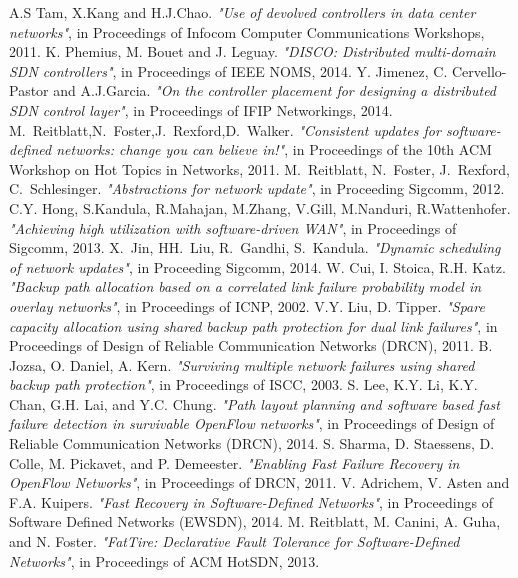 \documentclass[conference]{IEEEtran}
\begin{document}
\begin{thebibliography}{1}
A.S Tam, X.Kang and H.J.Chao. \emph{"Use of devolved controllers in data center networks"}, in Proceedings of Infocom Computer Communications Workshops, 2011.
K. Phemius, M. Bouet and J. Leguay. \emph{"DISCO: Distributed multi-domain SDN controllers"}, in Proceedings of IEEE NOMS, 2014.
Y. Jimenez, C. Cervello-Pastor and A.J.Garcia. \emph{"On the controller placement for designing a distributed SDN control layer"}, in Proceedings of IFIP Networkings, 2014.
M.~Reitblatt,N.~Foster,J.~Rexford,D.~Walker. \emph{"Consistent updates for software-defined networks: change you can believe in!"}, in Proceedings of the 10th ACM Workshop on Hot Topics in Networks, 2011.
M.~Reitblatt, N.~Foster, J.~Rexford, C.~Schlesinger. \emph{"Abstractions for network update"},  in Proceeding Sigcomm, 2012.
C.Y. Hong, S.Kandula, R.Mahajan, M.Zhang, V.Gill, M.Nanduri, R.Wattenhofer. \emph{"Achieving high utilization with software-driven WAN"}, in Proceedings of Sigcomm, 2013.
X.~Jin, HH.~Liu, R.~Gandhi, S.~Kandula. \emph{"Dynamic scheduling of network updates"},
in Proceeding Sigcomm, 2014. 
W. Cui, I. Stoica, R.H. Katz. \emph{"Backup path allocation based on a correlated link failure probability model in overlay networks"}, in Proceedings of ICNP, 2002.
V.Y. Liu, D. Tipper. \emph{"Spare capacity allocation using shared backup path protection for dual link failures"}, in Proceedings of Design of Reliable Communication Networks (DRCN), 2011.
B. Jozsa, O. Daniel, A. Kern. \emph{"Surviving multiple network failures using shared backup path protection"}, in Proceedings of ISCC, 2003.
S. Lee, K.Y. Li, K.Y. Chan, G.H. Lai, and Y.C. Chung. \emph{"Path
layout planning and software based fast failure detection in survivable OpenFlow networks"}, in Proceedings of Design of Reliable Communication Networks (DRCN), 2014.
S. Sharma, D. Staessens, D. Colle, M. Pickavet, and P. Demeester. \emph{"Enabling Fast Failure
Recovery in OpenFlow Networks"}, in Proceedings of DRCN, 2011.
V. Adrichem, V. Asten and  F.A. Kuipers. \emph{"Fast Recovery in Software-Defined Networks"}, in Proceedings of Software Defined Networks (EWSDN), 2014.
M. Reitblatt, M. Canini, A. Guha, and N. Foster. \emph{"FatTire: Declarative Fault Tolerance
for Software-Defined Networks"}, in Proceedings of ACM HotSDN, 2013.

\end{thebibliography}
\end{document}
